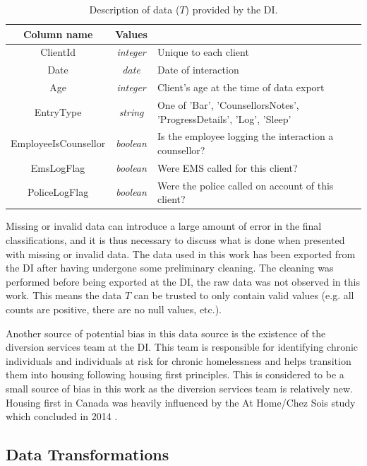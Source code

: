 \begin{table}[h!]
	\begin{tabular}{ c c p{} } 
		\toprule
		Column name & Values &  \\
		\midrule
		ClientId & \emph{integer} & Unique to each client \\
		Date & \emph{date} & Date of interaction \\
		Age & \emph{integer} & Client's age at the time of data export \\
		EntryType & \emph{string} & One of 'Bar', 'CounsellorsNotes', 'ProgressDetails', 'Log', 'Sleep' \\
		EmployeeIsCounsellor & \emph{boolean} & Is the employee logging the interaction a counsellor? \\
		EmsLogFlag & \emph{boolean} & Were EMS called for this client? \\
		PoliceLogFlag & \emph{boolean} & Were the police called on account of this client? \\
		\bottomrule
	\end{tabular}
	\caption{Description of data ($T$) provided by the DI.}
	\label{tbl:university}
\end{table}


Missing or invalid data can introduce a large amount of error in the final classifications, and it is thus necessary to discuss what is done when presented with missing or invalid data. The data used in this work has been exported from the DI after having undergone some preliminary cleaning. The cleaning was performed before being exported at the DI, the raw data was not observed in this work. This means the data $T$ can be trusted to only contain valid values (e.g. all counts are positive, there are no null values, etc.). 

Another source of potential bias in this data source is the existence of the diversion services team at the DI. This team is responsible for identifying chronic individuals and individuals at risk for chronic homelessness and helps transition them into housing following housing first principles. This is considered to be a small source of bias in this work as the diversion services team is relatively new. Housing first in Canada was heavily influenced by the At Home/Chez Sois study which concluded in 2014 \cite{athome2014chezsoi}.

\subsection{Data Transformations}

